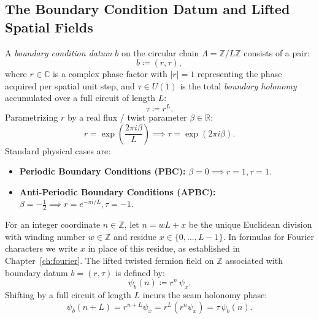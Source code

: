 \subsection{The Boundary Condition Datum and Lifted Spatial Fields}

\begin{definition}
A \emph{boundary condition datum} $b$ on the circular chain $\Lambda = \mathbb{Z}/L\mathbb{Z}$ consists of a pair:
\begin{equation}
b \coloneqq (r, \tau),
\end{equation}
where $r \in \mathbb{C}$ is a complex phase factor with $|r| = 1$ representing the phase acquired per spatial unit step, and $\tau \in U(1)$ is the total \emph{boundary holonomy} accumulated over a full circuit of length $L$:
\begin{equation}
\tau \coloneqq r^L.
\end{equation}
Parametrizing $r$ by a real flux / twist parameter $\beta \in \mathbb{R}$:
\begin{equation}
r = \exp\left(\frac{2\pi i \beta}{L}\right) \implies \tau = \exp(2\pi i \beta).
\end{equation}
Standard physical cases are:
\begin{itemize}
    \item \textbf{Periodic Boundary Conditions (PBC):} $\beta = 0 \implies r = 1, \tau = 1$.
    \item \textbf{Anti-Periodic Boundary Conditions (APBC):} $\beta = -\frac{1}{2} \implies r = e^{-\pi i / L}, \tau = -1$.
\end{itemize}
\end{definition}

\begin{definition}
For an integer coordinate $n \in \mathbb{Z}$, let $n = w L + x$ be the unique Euclidean division with winding number $w \in \mathbb{Z}$ and residue $x \in \{0, \dots, L-1\}$. In formulas for Fourier characters we write $x$ in place of this residue, as established in Chapter~\ref{ch:fourier}.
The lifted twisted fermion field on $\mathbb{Z}$ associated with boundary datum $b = (r, \tau)$ is defined by:
\begin{equation}
\psi_b(n) \coloneqq r^n\, \psi_x.
\end{equation}
Shifting by a full circuit of length $L$ incurs the seam holonomy phase:
\begin{equation}
\psi_b(n + L) = r^{n+L} \psi_x = r^L (r^n \psi_x) = \tau\, \psi_b(n).
\end{equation}
\end{definition}

